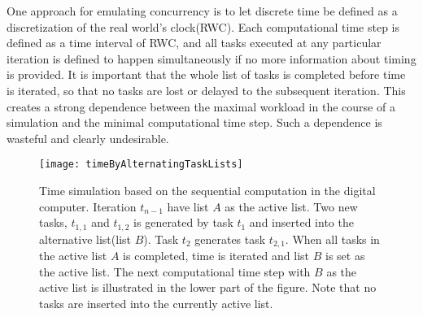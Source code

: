 		One approach for emulating concurrency is to let discrete time be defined as a discretization of the real world's clock(RWC).
		Each computational time step is defined as a time interval of RWC, and all tasks executed at any particular iteration is defined to happen simultaneously if no more information about timing is provided.
		It is important that the whole list of tasks is completed before time is iterated, so that no tasks are lost or delayed to the subsequent iteration.
		This creates a strong dependence between the maximal workload in the course of a simulation and the minimal computational time step.
		Such a dependence is wasteful and clearly undesirable.

\begin{figure}[hbt!p]
	\centering
	\texttt{[image: timeByAlternatingTaskLists]}
	\caption[Time simulation by alternating task lists]{
			Time simulation based on the sequential computation in the digital computer.
			Iteration $t_{n-1}$ have list $A$ as the active list. Two new tasks, $t_{1,1}$ and $t_{1,2}$ is generated by task $t_1$ and inserted into the alternative list(list $B$). Task $t_2$ generates task $t_{2,1}$.
			When all tasks in the active list $A$ is completed, time is iterated and list $B$ is set as the active list. 
			The next computational time step with $B$ as the active list is illustrated in the lower part of the figure.
			Note that no tasks are inserted into the currently active list.
			}
	\label{figTimePropagationByAlternatingTaskLists}
\end{figure}

